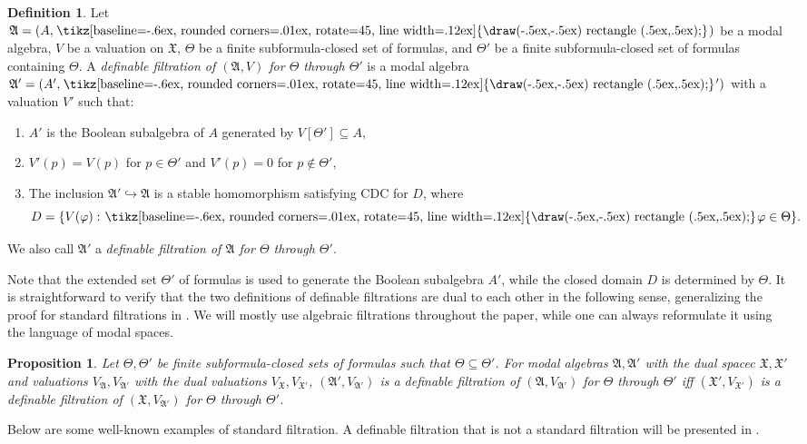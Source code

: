 \documentclass[a4paper,11pt]{article}
\newtheorem{proposition}[theorem]{Proposition}
\theoremstyle{definition}
\newtheorem{definition}[theorem]{Definition}
\theoremstyle{remark}
\numberwithin{theorem}{section}
\newcommand{\alg}[1]{\mathfrak{#1}}
\newcommand{\A}{\alg{A}}
\renewcommand{\sp}[1]{\mathfrak{#1}}
\newcommand{\X}{\sp{X}}
\renewcommand{\phi}{\varphi}
\newcommand{\gooddiamond}{\hspace{.2ex}\text{%
  \tikz[baseline=-.6ex, rounded corners=.01ex, rotate=45, line width=.12ex]
    {\draw(-.5ex,-.5ex) rectangle (.5ex,.5ex);}}\kern.2ex}
\renewcommand{\Diamond}{\gooddiamond}
\newcommand{\Dia}{\Diamond}
\newcommand{\inj}{\hookrightarrow}
\begin{document}
\begin{definition} \label{3: Def alg filtration}
    Let $\A = (A, \Dia)$ be a modal algebra, $V$ be a valuation on $\X$, $\Theta$ be a finite subformula-closed set of formulas, and $\Theta'$ be a finite subformula-closed set of formulas containing $\Theta$. A \emph{definable filtration of $(\A, V)$ for $\Theta$ through $\Theta'$} is a modal algebra $\A' = (A', \Dia')$ with a valuation $V'$ such that:
    \begin{enumerate}
        \item $A'$ is the Boolean subalgebra of $A$ generated by $V[\Theta'] \subseteq A$, 
        \item $V'(p) = V(p)$ for $p \in \Theta'$ and $V'(p) = 0$ for $p \notin \Theta'$,
        \item The inclusion $\A' \inj \A$ is a stable homomorphism satisfying CDC for $D$, where 
        \[D = \{V(\phi) : \Dia \phi \in \Theta\}.\]
    \end{enumerate}
    We also call $\A'$ a \emph{definable filtration of $\A$ for $\Theta$ through $\Theta'$}.
\end{definition}

Note that the extended set $\Theta'$ of formulas is used to generate the Boolean subalgebra $A'$, while the closed domain $D$ is determined by $\Theta$. It is straightforward to verify that the two definitions of definable filtrations are dual to each other in the following sense, generalizing the proof for standard filtrations in \cite[Theorem 4.2]{stablecanonicalrules}. We will mostly use algebraic filtrations throughout the paper, while one can always reformulate it using the language of modal spaces.


\begin{proposition}
    Let $\Theta, \Theta'$ be finite subformula-closed sets of formulas such that $\Theta \subseteq \Theta'$. For modal algebras $\A, \A'$ with the dual spacec $\X, \X'$ and valuations $V_\A, V_{\A'}$ with the dual valuations $V_\X, V_{\X'}$, $(\A', V_{\A'})$ is a definable filtration of $(\A, V_{\A'})$ for $\Theta$ through $\Theta'$ iff $(\X', V_{\X'})$ is a definable filtration of $(\X, V_{\A'})$ for $\Theta$ through $\Theta'$.
\end{proposition}

Below are some well-known examples of standard filtration. A definable filtration that is not a standard filtration will be presented in . 
\end{document}
